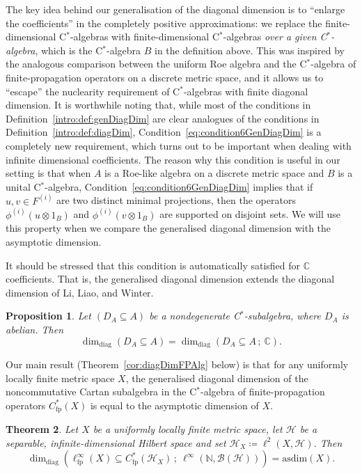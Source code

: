 \documentclass[a4paper]{amsart}
\newcommand{\myhyp}{\textnormal{-}\hskip0pt\relax}
\numberwithin{equation}{section}
\newcommand{\N}{\mathbb{N}}
\newcommand{\C}{\mathbb{C}}
\newcommand{\Bcal}{\mathcal{B}}
\newcommand{\Hcal}{\mathcal{H}}
\newcommand{\cstar}{C$^\ast$\myhyp{}algebra}
\newcommand{\cstarSub}{C$^\ast$\myhyp{}subalgebra}
\newcommand{\bop}[1]{\Bcal({#1})}
\newcommand{\Cfp}[1]{C^{\ast}_{\mathrm{fp}}({#1})}
\newcommand{\CfpCartan}[1]{\ell^{\infty}_{\mathrm{fp}}({#1})}
\newcommand{\prn}[1]{{(#1)}}
\newcommand{\ddim}[2]{\dim_{\mathrm{diag}}({#1}\subseteq{#2})}
\newcommand{\ddimn}[3]{\dim_{\mathrm{diag}}({#1}\subseteq{#2}\, ;~{#3})}
\newcommand{\asdim}[1]{\mathrm{asdim}({#1})}
\theoremstyle{plain}
\theoremstyle{indented}
\numberwithin{equation}{section}
\theoremstyle{definition}
\theoremstyle{remark}
\theoremstyle{plain}
\newtheorem{alphthm}{Theorem}
\newtheorem{alphpropo}[alphthm]{Proposition}
\theoremstyle{definition}
\begin{document}
The key idea behind our generalisation of the diagonal dimension 
is to ``enlarge the coefficients'' in the completely positive approximations:
we replace the 
finite\myhyp{}dimensional \cstar{}s with 
finite\myhyp{}dimensional \cstar{}s \emph{over a given \cstar{}},
which is the \cstar{} $B$ in the definition above.
This was inspired by the analogous comparison between the uniform Roe algebra and the \cstar{} of finite\myhyp{}propagation operators on a discrete metric space,
and it allows us to ``escape'' the nuclearity requirement of \cstar{}s with finite diagonal dimension.
It is worthwhile noting that, 
while most of the conditions in Definition~\ref{intro:def:genDiagDim} 
are clear analogues of the conditions in Definition~\ref{intro:def:diagDim}, 
Condition~\eqref{eq:condition6GenDiagDim} is a completely new requirement, which turns out to be important when dealing with infinite dimensional coefficients.
The reason why this condition is useful in our setting is that
when $A$ is a Roe\myhyp{}like algebra on a discrete metric space and $B$ is a unital \cstar{},
Condition~\eqref{eq:condition6GenDiagDim} implies that
if ${u, v\in F^\prn{i}}$ are two distinct minimal projections, then the operators
${\phi^\prn{i}\prn{u\otimes 1_B}}$ and ${\phi^\prn{i}\prn{v\otimes 1_B}}$ are supported on disjoint sets. 
We will use this property
when we compare the generalised diagonal dimension with the asymptotic dimension.

\medskip


It should be stressed that this condition is automatically satisfied for $\C$ coefficients. 
That is,
the generalised diagonal dimension
extends the diagonal dimension of Li, Liao, and Winter.


\begin{alphpropo}
    Let ${(D_A \subseteq A)}$ be a nondegenerate \cstarSub{}, where $D_A$ is abelian.
    Then 
    \begin{equation*}
        \ddim{D_A}{A} = \ddimn{D_A}{A}{\mathbb{C}}.
    \end{equation*}
\end{alphpropo}

\bigskip


Our main result (Theorem~\ref{cor:diagDimFPAlg} below) is that for any uniformly locally finite metric space $X$,  
the generalised diagonal dimension of the noncommutative Cartan subalgebra in the \cstar{} of finite\myhyp{}propagation operators $\Cfp{X}$ is equal to the asymptotic dimension of $X$.

\begin{alphthm} \label{intro:thm:diagDimFPAlg}
     Let $X$ be a uniformly locally finite metric space, let $\Hcal$ be a separable, infinite\myhyp{}dimensional Hilbert space and set ${\Hcal_X \coloneq \ell^2(X, \Hcal)}$. 
     Then
    \begin{equation*}
         \ddimn{\CfpCartan{X}}{\Cfp{\Hcal_X}}{\ell^\infty(\N, \bop{\Hcal})} = \asdim{X}.
    \end{equation*}
\end{alphthm}
\end{document}

